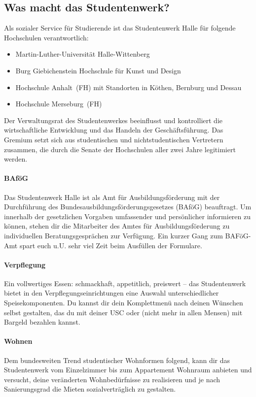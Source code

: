 \subsection{Was macht das Studentenwerk?}

Als sozialer Service für Studierende ist das Studentenwerk Halle für folgende Hochschulen verantwortlich:

\begin{itemize}
    \item Martin-Luther-Universität Halle-Wittenberg
    \item Burg Giebichenstein Hochschule für Kunst und Design
    \item Hochschule Anhalt~(FH) mit Standorten in Köthen, Bernburg und Dessau
    \item Hochschule Merseburg~(FH)
\end{itemize}

Der Verwaltungsrat des Studentenwerkes beeinflusst und kontrolliert die wirtschaftliche Entwicklung und das Handeln der Geschäftsführung.
Das Gremium setzt sich aus studentischen und nichtstudentischen Vertretern zusammen, die durch die Senate der Hochschulen aller zwei Jahre legitimiert werden.

\paragraph{BAföG}

Das Studentenwerk Halle ist als Amt für Ausbildungsförderung mit der Durchführung des Bundesausbildungsförderungsgesetzes (BAföG) beauftragt.
Um innerhalb der gesetzlichen Vorgaben umfassender und persönlicher informieren zu können, stehen dir die Mitarbeiter des Amtes für Ausbildungsförderung zu individuellen Beratungsgesprächen zur Verfügung.
Ein kurzer Gang zum BAFöG-Amt spart euch \;u.U. sehr viel Zeit beim Ausfüllen der Formulare.

\paragraph{Verpflegung}
Ein vollwertiges Essen: schmackhaft, appetitlich, preiswert -- das Studentenwerk bietet in den Verpflegungseinrichtungen eine Auswahl unterschiedlicher Speisekomponenten.
Du kannst dir dein Komplettmenü nach deinen Wünschen selbst gestalten, das du mit deiner USC oder (nicht mehr in allen Mensen) mit Bargeld bezahlen kannst.

\paragraph{Wohnen}
Dem bundesweiten Trend studentischer Wohnformen folgend, kann dir das Studentenwerk vom Einzelzimmer bis zum Appartement Wohnraum anbieten und
versucht, deine veränderten Wohnbedürfnisse zu realisieren und je nach Sanierungsgrad die Mieten sozialverträglich zu gestalten.

